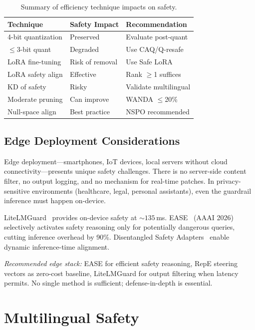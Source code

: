 \documentclass[12pt,a4paper]{article}
\begin{document}
\begin{table}[t]
\centering
\caption{Summary of efficiency technique impacts on safety.}\label{tab:efficiency}
\small
\begin{tabular}{@{}lll@{}}
\toprule
\textbf{Technique} & \textbf{Safety Impact} & \textbf{Recommendation} \\
\midrule
4-bit quantization & Preserved & Evaluate post-quant \\
$\leq$3-bit quant & Degraded & Use CAQ/Q-resafe \\
LoRA fine-tuning & Risk of removal & Use Safe LoRA \\
LoRA safety align & Effective & Rank $\geq$1 suffices \\
KD of safety & Risky & Validate multilingual \\
Moderate pruning & Can improve & WANDA $\leq$20\% \\
Null-space align & Best practice & NSPO recommended \\
\bottomrule
\end{tabular}
\end{table}

\subsection{Edge Deployment Considerations}

Edge deployment---smartphones, IoT devices, local servers without cloud connectivity---presents unique safety challenges. There is no server-side content filter, no output logging, and no mechanism for real-time patches. In privacy-sensitive environments (healthcare, legal, personal assistants), even the guardrail inference must happen on-device.

LiteLMGuard~\citep{nakka2025litelmguard} provides on-device safety at ${\sim}135$\,ms. EASE~\citep{ease2025} (AAAI 2026) selectively activates safety reasoning only for potentially dangerous queries, cutting inference overhead by 90\%. Disentangled Safety Adapters~\citep{krishna2025dsa} enable dynamic inference-time alignment.

\emph{Recommended edge stack:} EASE for efficient safety reasoning, RepE steering vectors as zero-cost baseline, LiteLMGuard for output filtering when latency permits. No single method is sufficient; defense-in-depth is essential.


\section{Multilingual Safety}\label{sec:multilingual}
\end{document}
